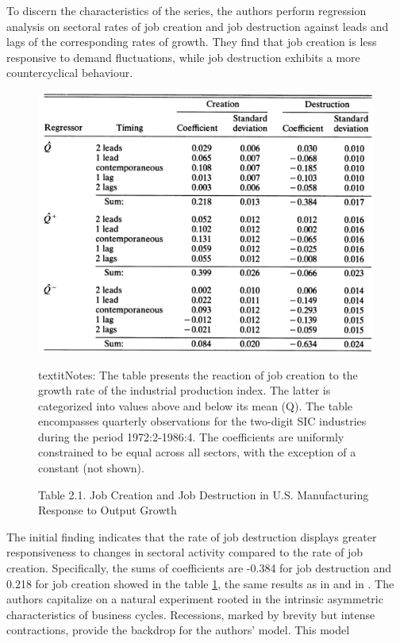 \documentclass[12pt]{article}
\begin{document}
To discern the characteristics of the series, the authors perform regression analysis on sectoral rates of job creation
and job destruction against leads and lags of the corresponding rates of growth. They find that job creation is less
responsive to demand fluctuations, while job destruction exhibits a more countercyclical behaviour. 
\begin{figure}
    \centering
    \includegraphics[scale = 0.4]{Plot2.3.png}
    \caption{Table 2.1. Job Creation and Job Destruction in U.S. Manufacturing Response to Output Growth}
    \label{Table 2.1.}
    \footnotesize textit{Notes}: The table presents the reaction of job creation to the growth rate of the industrial
    production index. The latter is categorized into values above and below its mean (Q). The table encompasses
    quarterly observations for the two-digit SIC industries during the period 1972:2-1986:4. The coefficients are
    uniformly constrained to be equal across all sectors, with the exception of a constant (not shown).  
\end{figure}
The initial finding indicates that the rate of job destruction displays greater responsiveness to changes in sectoral
activity compared to the rate of job creation. Specifically, the sums of coefficients are -0.384 for job destruction and
0.218 for job creation showed in the table \ref{Table 2.1.}, the same results as in \cite{DAvHalt90,DavHalt92} and in
\cite{BlaDia90}.
The authors capitalize on a natural experiment rooted in the intrinsic asymmetric characteristics of business cycles.
Recessions, marked by brevity but intense contractions, provide the backdrop for the authors' model. This model
\end{document}
